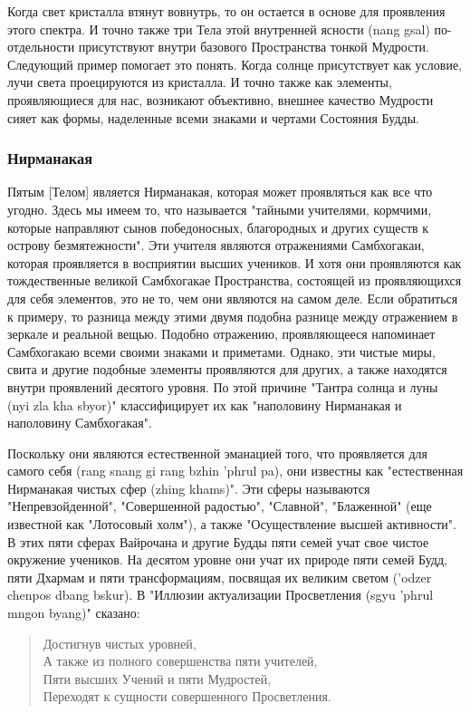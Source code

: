 Когда свет кристалла втянут вовнутрь, то он остается в основе для проявления этого
спектра. И точно также три Тела этой внутренней ясности (nang gsal) по-отдельности
присутствуют внутри базового Пространства тонкой Мудрости. Следующий пример
помогает это понять. Когда солнце присутствует как условие, лучи света проецируются из
кристалла. И точно также как элементы, проявляющиеся для нас, возникают объективно,
внешнее качество Мудрости сияет как формы, наделенные всеми знаками и чертами
Состояния Будды.

\subsubsection{Нирманакая}

Пятым [Телом] является Нирманакая, которая может проявляться как все что угодно.
Здесь мы имеем то, что называется "тайными учителями, кормчими, которые направляют
сынов победоносных, благородных и других существ к острову безмятежности". Эти учителя
являются отражениями Самбхогакаи, которая проявляется в восприятии высших учеников.
И хотя они проявляются как тождественные великой Самбхогакае Пространства,
состоящей из проявляющихся для себя элементов, это не то, чем они являются на самом
деле. Если обратиться к примеру, то разница между этими двумя подобна разнице между
отражением в зеркале и реальной вещью. Подобно отражению, проявляющееся напоминает
Самбхогакаю всеми своими знаками и приметами. Однако, эти чистые миры, свита и другие
подобные элементы проявляются для других, а также находятся внутри проявлений десятого
уровня. По этой причине "Тантра солнца и луны (nyi zla kha sbyor)" классифицирует их как
"наполовину Нирманакая и наполовину Самбхогакая".

Поскольку они являются естественной эманацией того, что проявляется для самого
себя (rang snang gi rang bzhin 'phrul pa), они известны как "естественная Нирманакая чистых
сфер (zhing khams)". Эти сферы называются "Непревзойденной", "Совершенной радостью",
"Славной", "Блаженной" (еще известной как "Лотосовый холм"), а также "Осуществление
высшей активности". В этих пяти сферах Вайрочана и другие Будды пяти семей учат свое
чистое окружение учеников. На десятом уровне они учат их природе пяти семей Будд, пяти
Дхармам и пяти трансформациям, посвящая их великим светом ('odzer chenpos dbang bskur).
В "Иллюзии актуализации Просветления (sgyu 'phrul mngon byang)" сказано:

\begin{verse}
Достигнув чистых уровней,\\
А также из полного совершенства пяти учителей,\\
Пяти высших Учений и пяти Мудростей,\\
Переходят к сущности совершенного Просветления.
\end{verse}

